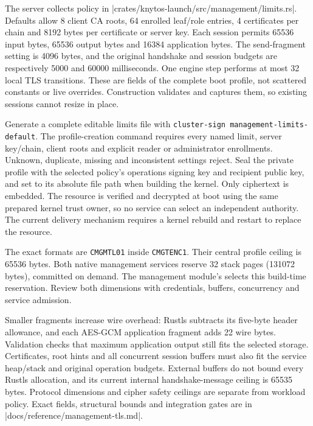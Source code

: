 The server collects policy in
\repofile|crates/knytos-launch/src/management/limits.rs|. Defaults allow 8 client
CA roots, 64 enrolled leaf/role entries, 4 certificates per chain and 8192 bytes
per certificate or server key. Each session permits 65536 input bytes,
65536 output bytes and 16384 application bytes. The send-fragment setting is
4096 bytes, and the original handshake and session budgets are respectively
5000 and 60000 milliseconds. One engine step performs at most 32 local TLS
transitions. These are fields of the complete boot profile, not scattered
constants or live overrides. Construction validates and captures them, so existing
sessions cannot resize in place.

Generate a complete editable limits file with
\texttt{cluster-sign management-limits-default}. The profile-creation command
requires every named limit, server key/chain, client roots and explicit reader
or administrator enrollments. Unknown, duplicate, missing and inconsistent
settings reject. Seal the private profile with the selected policy's operations
signing key and recipient public key, and set
 to its absolute file path when
building the kernel. Only ciphertext is embedded. The resource is verified and
decrypted at boot using the same prepared kernel trust owner, so no service can
select an independent authority. The current delivery mechanism requires a
kernel rebuild and restart to replace the resource.

The exact formats are \texttt{CMGMTL01} inside \texttt{CMGTENC1}. Their central
profile ceiling is 65536 bytes. Both native management services reserve 32 stack
pages (131072 bytes), committed on demand. The management module's
 selects this build-time reservation. Review both
dimensions with credentials, buffers, concurrency and service admission.

Smaller fragments increase wire overhead: Rustls subtracts its five-byte header
allowance, and each AES-GCM application fragment adds 22 wire bytes. Validation
checks that maximum application output still fits the selected storage.
Certificates, root hints and all concurrent session buffers must also fit the
service heap/stack and original operation budgets. External buffers do not bound
every Rustls allocation, and its current internal handshake-message ceiling is
65535 bytes. Protocol dimensions and cipher safety ceilings are separate from
workload policy. Exact fields, structural bounds and integration gates are in
\repofile|docs/reference/management-tls.md|.

